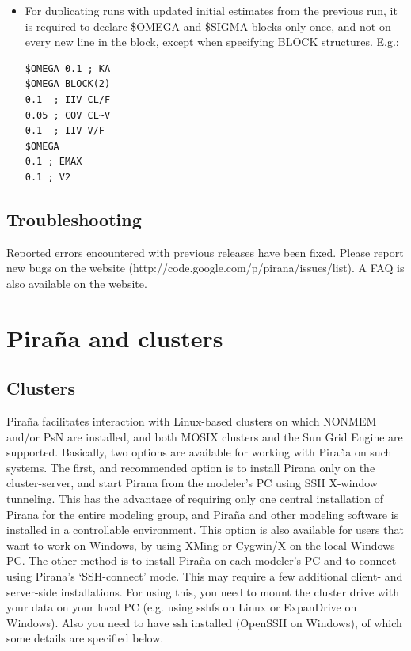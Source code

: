 \documentclass[a4,11pt]{report} \usepackage[pdftex]{graphicx}
\begin{document}
{{\begin{itemize}
Note that PsN has it's own functionality for doing this.

\item For duplicating runs with updated initial estimates from the
previous run, it is required to declare \$OMEGA and \$SIGMA blocks
only once, and not on every new line in the block, except when
specifying BLOCK structures. E.g.:

\begin{verbatim}
$OMEGA 0.1 ; KA
$OMEGA BLOCK(2)
0.1  ; IIV CL/F
0.05 ; COV CL~V
0.1  ; IIV V/F
$OMEGA
0.1 ; EMAX
0.1 ; V2
\end{verbatim}

\end{itemize}

\section{Troubleshooting}

Reported errors encountered with previous releases have been
fixed. Please report new bugs on the website
(http://code.google.com/p/pirana/issues/list). A FAQ is also
available on the website.



\chapter{Pira\~na and clusters}

\section{Clusters} Pira\~na facilitates interaction with Linux-based
clusters on which NONMEM and/or PsN are installed, and both MOSIX
clusters and the Sun Grid Engine are supported. Basically, two options
are available for working with Pira\~na on such systems.  The first,
and recommended option is to install Pirana only on the cluster-server, and start
Pirana from the modeler's PC using SSH X-window tunneling. This has
the advantage of requiring only one central installation of Pirana for
the entire modeling group, and Pira\~na and other modeling software is
installed in a controllable environment. This option is also available
for users that want to work on Windows, by using XMing or Cygwin/X on
the local Windows PC.  The other method is to install Pira\~na on each
modeler's PC and to connect using Pirana's `SSH-connect' mode. This
may require a few additional client- and server-side
installations. For using this, you need to mount the cluster drive
with your data on your local PC (e.g. using sshfs on Linux or
ExpanDrive on Windows). Also you need to have ssh installed (OpenSSH
on Windows), of which some details are specified below.

}}
\end{document}
